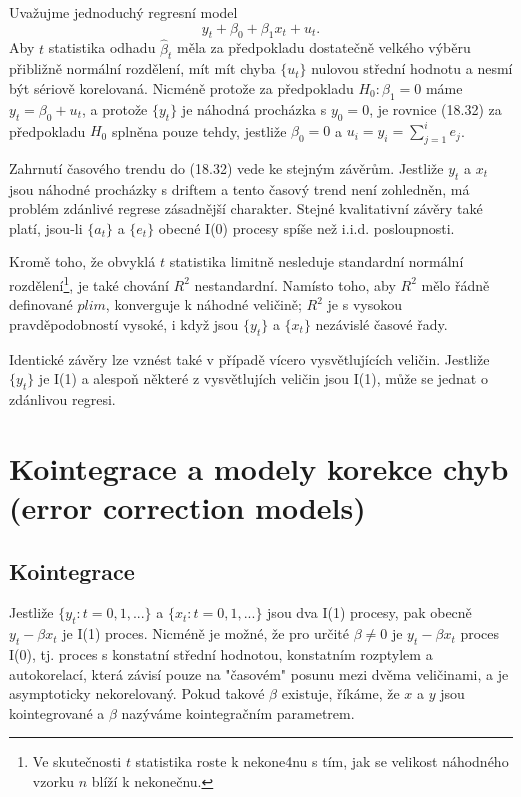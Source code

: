 Uvažujme jednoduchý regresní model
\begin{equation}
y_t + \beta_0 + \beta_1 x_t + u_t.
\end{equation}
Aby $t$ statistika odhadu $\hat{\beta}_t$ měla za předpokladu dostatečně velkého výběru přibližně 
normální rozdělení, mít mít chyba $\{u_t\}$ nulovou střední hodnotu a nesmí být sériově korelovaná. Nicméně 
protože za předpokladu $H_0: \beta_1 = 0$ máme $y_t = \beta_0 + u_t$, a protože $\{y_t\}$ je náhodná procházka s $y_0 = 0$, 
je rovnice (18.32) za předpokladu $H_0$ splněna pouze tehdy, jestliže $\beta_0 = 0$ a $u_i = y_i = \sum_{j = 1}^i 
e_j$.

Zahrnutí časového trendu do (18.32) vede ke stejným závěrům. Jestliže $y_t$ a $x_t$ jsou náhodné procházky s driftem a 
tento časový trend není zohledněn, má problém zdánlivé regrese zásadnější charakter. Stejné kvalitativní 
závěry také platí, jsou-li $\{a_t\}$ a $\{e_t\}$ obecné I(0) procesy spíše než i.i.d. posloupnosti.

Kromě toho, že obvyklá $t$ statistika limitně nesleduje standardní normální rozdělení\footnote{Ve skutečnosti 
$t$ statistika roste k nekone4nu s tím, jak se velikost náhodného vzorku $n$ blíží k nekonečnu.}, je také 
chování $R^2$ nestandardní. Namísto toho, aby $R^2$ mělo řádně definované $plim$, konverguje k náhodné 
veličině; $R^2$ je s vysokou pravděpodobností vysoké, i když jsou $\{y_t\}$ a $\{x_t\}$ nezávislé časové řady.

Identické závěry lze vznést také v případě vícero vysvětlujících veličin. Jestliže $\{y_t\}$ je I(1) a 
alespoň některé z vysvětlujích veličin jsou I(1), může se jednat o zdánlivou regresi.

\section{Kointegrace a modely korekce chyb (error correction models)}

\subsection{Kointegrace}

Jestliže $\{y_t: t = 0, 1, ...\}$ a $\{x_t: t = 0, 1, ...\}$ jsou dva I(1) procesy, pak obecně $y_t - \beta x_t$ je 
I(1) proces. Nicméně je možné, že pro určité $\beta \ne 0$ je $y_t - \beta x_t$ proces I(0), tj. proces s 
konstatní střední hodnotou, konstatním rozptylem a autokorelací, která závisí pouze na "časovém" posunu
mezi dvěma veličinami, a je asymptoticky nekorelovaný. Pokud takové $\beta$ existuje, říkáme, že $x$ a $y$ jsou 
kointegrované a $\beta$ nazýváme kointegračním parametrem.

